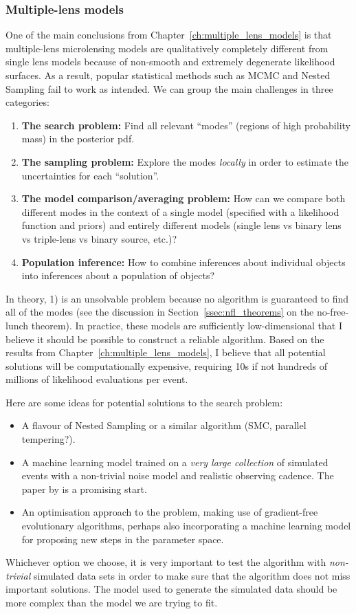 \documentclass[12pt,dvipsnames]{report}
\begin{document}
\subsubsection{Multiple-lens models}
One of the main conclusions from Chapter~\ref{ch:multiple_lens_models} is that multiple-lens 
microlensing models are qualitatively completely different from single lens models because 
of non-smooth and extremely degenerate likelihood surfaces. As a result, popular statistical 
methods such as MCMC and Nested Sampling fail to work as intended. We can group the main challenges
in three categories:
\begin{enumerate}
    \item \textbf{The search problem:} Find all relevant ``modes'' (regions of high probability mass)
    in the posterior pdf.     
\item \textbf{The sampling problem:} Explore the modes \emph{locally} in order to estimate 
    the uncertainties for each ``solution''. 
\item \textbf{The model comparison/averaging problem:} How can we compare both different 
modes in the context of a single model (specified with a likelihood function and priors) and entirely 
different models (single lens vs binary lens vs triple-lens vs binary source, etc.)?
\item \textbf{Population inference:} How to combine inferences about individual objects 
into inferences about a population of objects?
\end{enumerate}
In theory, 1) is an unsolvable problem because no algorithm 
is guaranteed to find all of the modes (see the discussion in Section~\ref{ssec:nfl_theorems}
on the no-free-lunch theorem). In practice, these models are sufficiently low-dimensional
that I believe it should be possible to construct a reliable algorithm. Based on the 
results from Chapter~\ref{ch:multiple_lens_models}, I believe that all potential solutions will be 
computationally expensive, requiring 10s if not hundreds of millions of likelihood 
evaluations per event. 

Here are some ideas for potential solutions to the search problem:
\begin{itemize}
    \item A flavour of Nested Sampling or a similar algorithm (SMC, parallel tempering?).
    \item A machine learning model trained on a \emph{very large collection} of simulated events with 
    a non-trivial noise model and realistic observing cadence. 
    The paper by \citet{https://arxiv.org/abs/2206.08199} is a promising start.
    \item An optimisation approach to the problem, making use of gradient-free evolutionary 
    algorithms, perhaps also incorporating a machine learning model for proposing new 
    steps in the parameter space.
\end{itemize}
Whichever option we choose, it is very important to test the algorithm with 
\emph{non-trivial} simulated data sets in order to make sure that the algorithm 
does not miss important solutions. The model used to generate the simulated data should 
be more complex than the model we are trying to fit.
\end{document}
